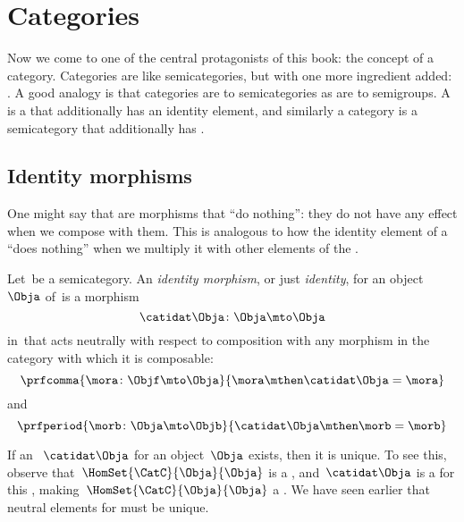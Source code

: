 \section{Categories}

Now we come to one of the central protagonists of this book: the concept of a category.
Categories are like semicategories, but with one more ingredient added: .
A good analogy is that categories are to semicategories as  are to semigroups.
A  is a  that additionally has an identity element, and similarly a category is a semicategory that additionally has .

\subsection{Identity morphisms}

One might say that   are morphisms that ``do nothing'': they do not have any effect when we compose with them.
This is analogous to how the identity element of a  ``does nothing'' when we multiply it with other elements of the .

\begin{ctdefinition}
    \label{def:identity-morphism}
    Let~\CatC be a semicategory.
    An \emph{identity morphism}, or just \emph{identity}, for an object~$\Obja$ of~\CatC is a morphism
    \begin{equation}
        \catidat\Obja \colon \Obja \mto \Obja
    \end{equation}
    in~\CatC that acts neutrally with respect to composition with any morphism in the category with which it is composable:
    \begin{equation}
        \prfcomma{
            \mora \colon \Objf \mto \Obja
        }{
            \mora \mthen \catidat\Obja = \mora
        }
    \end{equation}
    and
    \begin{equation}
        \prfperiod{
            \morb \colon \Obja \mto \Objb
        }{
            \catidat\Obja \mthen \morb = \morb
        }
    \end{equation}
\end{ctdefinition}

\begin{remark}
    If an ~$\catidat\Obja$ for an object~$\Obja$ exists, then it is unique.
    To see this, observe that~$\HomSet{\CatC}{\Obja}{\Obja}$ is a , and~$\catidat\Obja$ is a  for this , making~$\HomSet{\CatC}{\Obja}{\Obja}$ a .
    We have seen earlier that neutral elements for  must be unique.
\end{remark}

